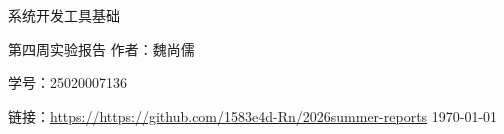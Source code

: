\documentclass[12pt, a4paper]{article}
\newcommand{\myname}{魏尚儒}
\newcommand{\myid}{25020007136}
\newcommand{\mygithub}{https://https://github.com/1583e4d-Rn/2026summer-reports}
\begin{document}
\begin{titlepage}
    \centering
    \thispagestyle{empty}
    {\Huge 系统开发工具基础}
    \par
    \vspace{1em}
    {\Large 第四周实验报告}
    \vfill
    {\large 作者：\myname}
    \par
    {\large 学号：\myid}
    \par
    {\large 链接：\url{\mygithub}}
    {\large \today}

\end{titlepage}


\tableofcontents
\thispagestyle{empty}
\newpage




\end{document}

